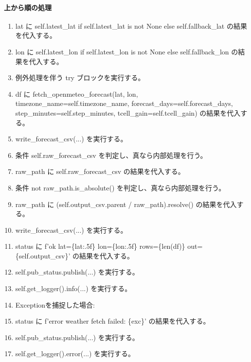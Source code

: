 \documentclass[a4paper,11pt]{article}
\begin{document}
            \paragraph{上から順の処理}
            \begin{enumerate}[leftmargin=1.8em]
            \item lat に self.latest\_lat if self.latest\_lat is not None else self.fallback\_lat の結果を代入する。
\item lon に self.latest\_lon if self.latest\_lon is not None else self.fallback\_lon の結果を代入する。
\item 例外処理を伴う try ブロックを実行する。
\item   df に fetch\_openmeteo\_forecast(lat, lon, timezone\_name=self.timezone\_name, forecast\_days=self.forecast\_days, step\_minutes=self.step\_minutes, tcell\_gain=self.tcell\_gain) の結果を代入する。
\item   write\_forecast\_csv(...) を実行する。
\item   条件 self.raw\_forecast\_csv を判定し、真なら内部処理を行う。
\item     raw\_path に self.raw\_forecast\_csv の結果を代入する。
\item     条件 not raw\_path.is\_absolute() を判定し、真なら内部処理を行う。
\item       raw\_path に (self.output\_csv.parent / raw\_path).resolve() の結果を代入する。
\item     write\_forecast\_csv(...) を実行する。
\item   status に f'ok lat=\{lat:.5f\} lon=\{lon:.5f\} rows=\{len(df)\} out=\{self.output\_csv\}' の結果を代入する。
\item   self.pub\_status.publish(...) を実行する。
\item   self.get\_logger().info(...) を実行する。
\item   Exceptionを捕捉した場合:
\item   status に f'error weather fetch failed: \{exc\}' の結果を代入する。
\item   self.pub\_status.publish(...) を実行する。
\item   self.get\_logger().error(...) を実行する。
            \end{enumerate}
\end{document}

